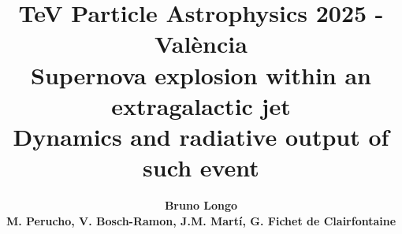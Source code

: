 \documentclass[unknownkeysallowed,table]{beamer}
\title[]{{\small TeV Particle Astrophysics 2025 - València}\vspace{.5cm} \\
\bf{Supernova explosion within an extragalactic jet\\Dynamics and radiative output of such event}}
\author[]{\large \bf{ Bruno Longo} \\
{\scriptsize M. Perucho, V. Bosch-Ramon, J.M. Mart\'i, G. Fichet de Clairfontaine}}
\institute[]{Departament d'Astronomia i Astrof\'isica, Universitat de València }
\begin{document}
\begin{frame}[plain]
\maketitle
\end{frame}



\end{document}
